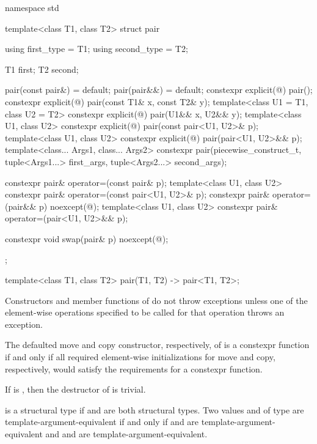 %
\begin{codeblock}
namespace std {
  template<class T1, class T2>
  struct pair {
    using first_type  = T1;
    using second_type = T2;

    T1 first;
    T2 second;

    pair(const pair&) = default;
    pair(pair&&) = default;
    constexpr explicit(@\seebelow@) pair();
    constexpr explicit(@\seebelow@) pair(const T1& x, const T2& y);
    template<class U1 = T1, class U2 = T2>
      constexpr explicit(@\seebelow@) pair(U1&& x, U2&& y);
    template<class U1, class U2>
      constexpr explicit(@\seebelow@) pair(const pair<U1, U2>& p);
    template<class U1, class U2>
      constexpr explicit(@\seebelow@) pair(pair<U1, U2>&& p);
    template<class... Args1, class... Args2>
      constexpr pair(piecewise_construct_t,
                     tuple<Args1...> first_args, tuple<Args2...> second_args);

    constexpr pair& operator=(const pair& p);
    template<class U1, class U2>
      constexpr pair& operator=(const pair<U1, U2>& p);
    constexpr pair& operator=(pair&& p) noexcept(@\seebelow@);
    template<class U1, class U2>
      constexpr pair& operator=(pair<U1, U2>&& p);

    constexpr void swap(pair& p) noexcept(@\seebelow@);
  };

  template<class T1, class T2>
    pair(T1, T2) -> pair<T1, T2>;
}
\end{codeblock}

\pnum
Constructors and member functions of  do not throw exceptions unless one of
the element-wise operations specified to be called for that operation
throws an exception.

\pnum
The defaulted move and copy constructor, respectively, of 
is a constexpr function if and only if all required element-wise
initializations for move and copy, respectively, would satisfy the
requirements for a constexpr function.

\pnum
If 
is , then the destructor of  is trivial.

\pnum
{} is a structural type
if  and  are both structural types.
Two values  and  of type 
are template-argument-equivalent if and only if
 and  are template-argument-equivalent and
 and  are template-argument-equivalent.

